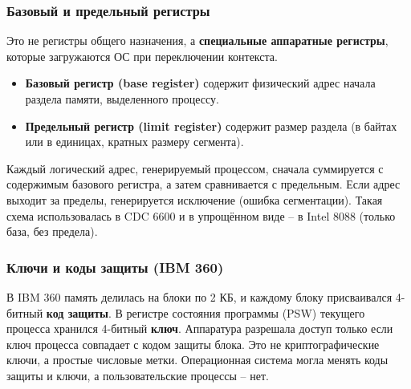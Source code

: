 \documentclass[a4paper,12pt]{article}
\begin{document}
\subsubsection{Базовый и предельный регистры}
Это не регистры общего назначения, а \textbf{специальные аппаратные регистры}, которые загружаются ОС при переключении контекста.
\begin{itemize}
    \item \textbf{Базовый регистр (base register)} содержит физический адрес начала раздела памяти, выделенного процессу.
    \item \textbf{Предельный регистр (limit register)} содержит размер раздела (в байтах или в единицах, кратных размеру сегмента).
\end{itemize}
Каждый логический адрес, генерируемый процессом, сначала суммируется с содержимым базового регистра, а затем сравнивается с предельным. Если адрес выходит за пределы, генерируется исключение (ошибка сегментации). Такая схема использовалась в CDC 6600 и в упрощённом виде – в Intel 8088 (только база, без предела).

\subsubsection{Ключи и коды защиты (IBM 360)}
В IBM 360 память делилась на блоки по 2 КБ, и каждому блоку присваивался 4-битный \textbf{код защиты}. В регистре состояния программы (PSW) текущего процесса хранился 4-битный \textbf{ключ}. Аппаратура разрешала доступ только если ключ процесса совпадает с кодом защиты блока. Это не криптографические ключи, а простые числовые метки. Операционная система могла менять коды защиты и ключи, а пользовательские процессы – нет.
\end{document}
